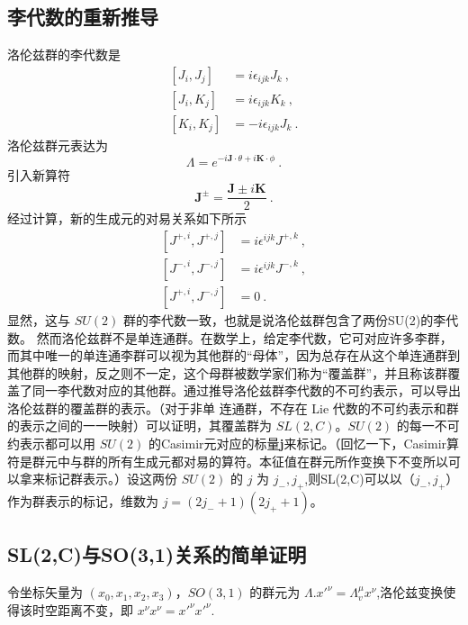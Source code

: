 
\subsection{李代数的重新推导}
洛伦兹群的李代数是
\begin{equation}
\begin{aligned}
\left[J_{i}, J_{j}\right] &=i \epsilon_{i j k} J_{k}~, \\
\left[J_{i}, K_{j}\right] &=i \epsilon_{i j k} K_{k} ~,\\
\left[K_{i}, K_{j}\right] &=-i \epsilon_{i j k} J_{k}~.
\end{aligned}
\end{equation}
洛伦兹群元表达为
\begin{equation}\label{eq_qed3_1}
\Lambda=e^{-i \mathbf{J} \cdot \theta+i \mathbf{K} \cdot \phi}~.
\end{equation}
引入新算符
\begin{equation}
\mathbf{J}^{\pm}=\frac{\mathbf{J} \pm i \mathbf{K}}{2}~.
\end{equation}
经过计算，新的生成元的对易关系如下所示
\begin{equation}
\begin{aligned}
\left[J^{+, i}, J^{+, j}\right] &=i \epsilon^{i j k} J^{+, k}~, \\
\left[J^{-, i}, J^{-, j}\right] &=i \epsilon^{i j k} J^{-, k}~, \\
\left[J^{+, i}, J^{-, j}\right] &=0~.
\end{aligned}
\end{equation}
显然，这与 $SU(2)$ 群的李代数一致，也就是说洛伦兹群包含了两份SU(2)的李代数。
然而洛伦兹群不是单连通群。在数学上，给定李代数，它可对应许多李群，而其中唯一的单连通李群可以视为其他群的“母体”，因为总存在从这个单连通群到其他群的映射，反之则不一定，这个母群被数学家们称为“覆盖群”，并且称该群覆盖了同一李代数对应的其他群。通过推导洛伦兹群李代数的不可约表示，可以导出洛伦兹群的覆盖群的表示。（对于非单
连通群，不存在 Lie 代数的不可约表示和群的表示之间的一一映射）可以证明，其覆盖群为 $SL(2,C)$。$SU(2)$ 的每一不可约表示都可以用 $SU(2)$ 的Casimir元对应的标量\textbf{j}来标记。（回忆一下，Casimir算符是群元中与群的所有生成元都对易的算符。本征值在群元所作变换下不变所以可以拿来标记群表示。）设这两份 $SU(2)$ 的 $j$ 为 $j_-,j_+$,则SL(2,C)可以以（$j_-,j_+$）作为群表示的标记，维数为 $j=(2j_-+1)(2j_++1)$。

\subsection{SL(2,C)与SO(3,1)关系的简单证明}
令坐标矢量为 $(x_0,x_1,x_2,x_3)$，$SO(3,1)$ 的群元为 $\Lambda$.$x'^{\nu}=\Lambda_{v}^{\mu} x^{\nu}$,洛伦兹变换使得该时空距离不变，即 $x^\nu x^\nu=x'^\nu x'^\nu$.

